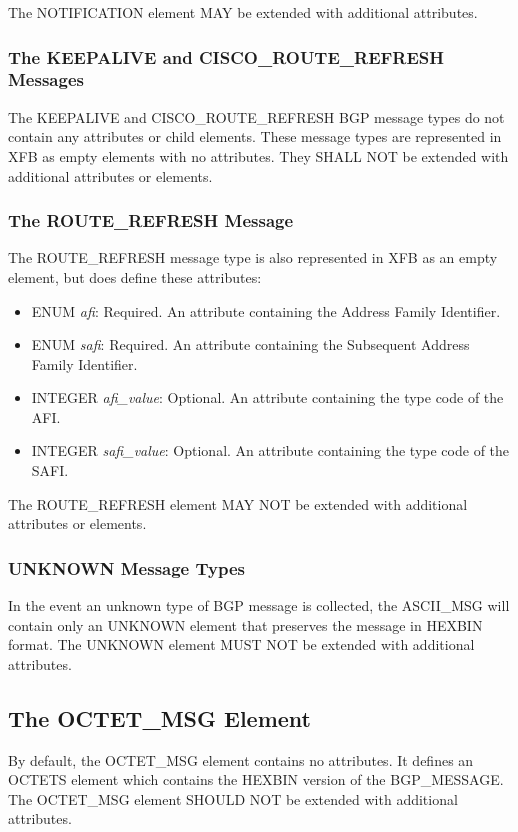 \documentclass{article}
\begin{document}
The NOTIFICATION element MAY be extended with additional attributes.

\subsubsection{The KEEPALIVE and CISCO_ROUTE_REFRESH Messages}
\label{OTHER}
The KEEPALIVE and CISCO_ROUTE_REFRESH BGP message types do not contain any attributes or child elements. These message types are represented in XFB as empty elements with no attributes.  They SHALL NOT be extended with additional attributes or elements.

\subsubsection{The ROUTE_REFRESH Message}
\label{RR}
The ROUTE_REFRESH message type is also represented in XFB as an empty element, but does define these attributes:

\begin{itemize}
\item{ENUM \emph{afi}: Required. An attribute containing the Address Family Identifier.}
\item{ENUM \emph{safi}: Required. An attribute containing the Subsequent Address Family Identifier.}
\item{INTEGER \emph{afi_value}: Optional. An attribute containing the type code of the AFI.}
\item{INTEGER \emph{safi_value}: Optional. An attribute containing the type code of the SAFI.}
\end{itemize}

The ROUTE_REFRESH element MAY NOT be extended with additional attributes or elements.

\subsubsection{UNKNOWN Message Types}
\label{UK}
In the event an unknown type of BGP message is collected, the ASCII_MSG will contain only an UNKNOWN element that preserves the message in HEXBIN format.  The UNKNOWN element MUST NOT be extended with additional attributes.

\subsection{The OCTET_MSG Element}
\label{OCTET}
By default, the OCTET_MSG element contains no attributes.  It defines an OCTETS element which contains the HEXBIN version of the BGP_MESSAGE.  The OCTET_MSG element SHOULD NOT be extended with additional attributes.
\end{document}
